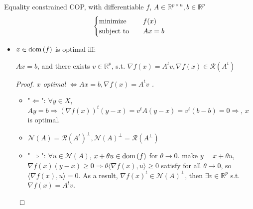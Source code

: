 \begin{remark}
    Equality constrained COP, with differentiable $f$, $A \in \mathbb{R}^{p \times n}, b \in \mathbb{R}^p$ \[\begin{cases}
        \operatorname{minimize} \quad &f(x)\\
        \operatorname{subject\ to} \quad &Ax = b
    \end{cases}\]
    \begin{itemize}
        \item $x \in \operatorname{dom}{(f)}$ is optimal iff:\begin{center}
            $Ax = b$, and there exists $v \in \mathbb{R}^p$, s.t. $\nabla f(x) = A^tv, \nabla f(x) \in \mathcal{R}(A^t)$
        \end{center}
        \begin{proof}[Proof. $x$ optimal $\Longleftrightarrow Ax = b, \nabla f(x) = A^tv$ ]
            \text{}
            \begin{itemize}
                \item "$\Longleftarrow$": $\forall y \in X$, $Ay = b \Longrightarrow (\nabla f(x))^t(y - x) = v^tA(y - x) = v^t(b - b) = 0 \Longrightarrow$, $x$ is optimal.
                \item $\mathcal{N}(A) = \mathcal{R}(A^t)^\perp, \mathcal{N}(A)^\perp = \mathcal{R}(A^\perp)$
                \item "$\Longrightarrow$": $\forall u \in \mathcal{N}(A)$, $x + \theta u \in \operatorname{dom}{(f)}$ for $\theta \to 0$. make $y = x + \theta u$, $\nabla f(x)(y - x) \ge 0 \Longrightarrow \theta \langle\nabla f(x), u\rangle \ge 0$ satisfy for all $\theta \to 0$, so $\langle\nabla f(x), u\rangle = 0$. As a result, $\nabla f(x)^t \in \mathcal{N}(A)^\perp$, then $\exists v \in \mathbb{R}^p$ s.t. $\nabla f(x) = A^tv$.
            \end{itemize}
        \end{proof}
    \end{itemize}
\end{remark}

